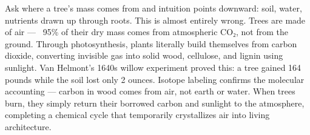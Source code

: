 Ask where a tree's mass comes from and intuition points downward: soil, water, nutrients drawn up through roots. This is almost entirely wrong. Trees are made of air — ~95\% of their dry mass comes from atmospheric CO₂, not from the ground. Through photosynthesis, plants literally build themselves from carbon dioxide, converting invisible gas into solid wood, cellulose, and lignin using sunlight. Van Helmont's 1640s willow experiment proved this: a tree gained 164 pounds while the soil lost only 2 ounces. Isotope labeling confirms the molecular accounting — carbon in wood comes from air, not earth or water. When trees burn, they simply return their borrowed carbon and sunlight to the atmosphere,  completing a chemical cycle that temporarily crystallizes air into living architecture.
